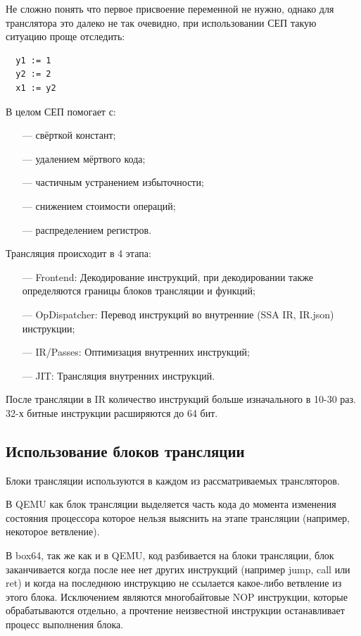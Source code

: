 Не сложно понять что первое присвоение переменной не нужно, однако для транслятора это далеко не так очевидно, при использовании СЕП такую ситуацию проще отследить:
\begin{Verbatim}
  y1 := 1
  y2 := 2
  x1 := y2
\end{Verbatim}

В целом СЕП помогает с:
\begin{itemize}[leftmargin=1.6\parindent]
	\item[---] свёрткой констант;
	\item[---] удалением мёртвого кода;
	\item[---] частичным устранением избыточности;
	\item[---] снижением стоимости операций;
	\item[---] распределением регистров.
\end{itemize}

Трансляция происходит в 4 этапа:

\begin{itemize}[leftmargin=1.6\parindent]
	\item[---] Frontend: Декодирование инструкций, при декодировании также определяются границы блоков трансляции и функций;
	\item[---] OpDispatcher: Перевод инструкций во внутренние (SSA IR, IR.json) инструкции;
	\item[---] IR/Passes: Оптимизация внутренних инструкций;
	\item[---] JIT: Трансляция внутренних инструкций.
\end{itemize}

После трансляции в IR количество инструкций больше изначального в 10-30 раз. 32-х битные инструкции расширяются до 64 бит.

\subsection{Использование блоков трансляции}

Блоки трансляции используются в каждом из рассматриваемых трансляторов.

В QEMU как блок трансляции выделяется часть кода до момента изменения состояния процессора которое нельзя выяснить на этапе трансляции (например, некоторое ветвление). \cite{qemu_docs}

В box64, так же как и в QEMU, код разбивается на блоки трансляции, блок заканчивается когда после нее нет других инструкций (например jump, call или ret) и когда на последнюю инструкцию не ссылается какое-либо ветвление из этого блока. Исключением являются многобайтовые NOP инструкции, которые обрабатываются отдельно, а прочтение неизвестной инструкции останавливает процесс выполнения блока. \cite{box64_letter}

